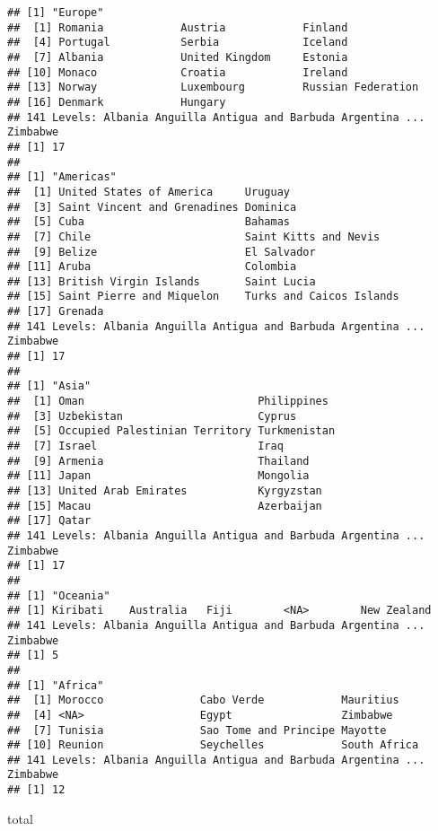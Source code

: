 \documentclass[]{article}
\newenvironment{Shaded}{\begin{snugshade}}{\end{snugshade}}
\newcommand{\NormalTok}[1]{#1}
\begin{document}
\begin{verbatim}
## [1] "Europe"
##  [1] Romania            Austria            Finland           
##  [4] Portugal           Serbia             Iceland           
##  [7] Albania            United Kingdom     Estonia           
## [10] Monaco             Croatia            Ireland           
## [13] Norway             Luxembourg         Russian Federation
## [16] Denmark            Hungary           
## 141 Levels: Albania Anguilla Antigua and Barbuda Argentina ... Zimbabwe
## [1] 17
## 
## [1] "Americas"
##  [1] United States of America     Uruguay                     
##  [3] Saint Vincent and Grenadines Dominica                    
##  [5] Cuba                         Bahamas                     
##  [7] Chile                        Saint Kitts and Nevis       
##  [9] Belize                       El Salvador                 
## [11] Aruba                        Colombia                    
## [13] British Virgin Islands       Saint Lucia                 
## [15] Saint Pierre and Miquelon    Turks and Caicos Islands    
## [17] Grenada                     
## 141 Levels: Albania Anguilla Antigua and Barbuda Argentina ... Zimbabwe
## [1] 17
## 
## [1] "Asia"
##  [1] Oman                           Philippines                   
##  [3] Uzbekistan                     Cyprus                        
##  [5] Occupied Palestinian Territory Turkmenistan                  
##  [7] Israel                         Iraq                          
##  [9] Armenia                        Thailand                      
## [11] Japan                          Mongolia                      
## [13] United Arab Emirates           Kyrgyzstan                    
## [15] Macau                          Azerbaijan                    
## [17] Qatar                         
## 141 Levels: Albania Anguilla Antigua and Barbuda Argentina ... Zimbabwe
## [1] 17
## 
## [1] "Oceania"
## [1] Kiribati    Australia   Fiji        <NA>        New Zealand
## 141 Levels: Albania Anguilla Antigua and Barbuda Argentina ... Zimbabwe
## [1] 5
## 
## [1] "Africa"
##  [1] Morocco               Cabo Verde            Mauritius            
##  [4] <NA>                  Egypt                 Zimbabwe             
##  [7] Tunisia               Sao Tome and Principe Mayotte              
## [10] Reunion               Seychelles            South Africa         
## 141 Levels: Albania Anguilla Antigua and Barbuda Argentina ... Zimbabwe
## [1] 12
\end{verbatim}

\begin{Shaded}
\begin{Highlighting}[]
\NormalTok{total}
\end{Highlighting}
\end{Shaded}
\end{document}
